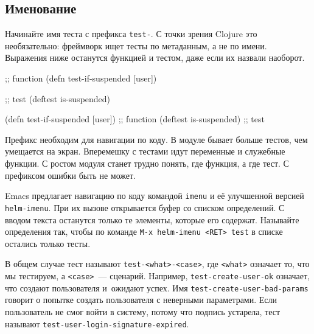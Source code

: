 \subsection{Именование}

Начинайте имя теста с префикса \verb|test-|. С точки зрения Clojure это
необязательно: фреймворк ищет тесты по метаданным, а не по имени. Выражения ниже
останутся функцией и тестом, даже если их назвали наоборот.

\ifnarrow

\begin{english}
  \begin{clojure}
;; function
(defn test-if-suspended [user])

;; test
(deftest is-suspended)
  \end{clojure}
\end{english}

\else

\begin{english}
  \begin{clojure}
(defn test-if-suspended [user]) ;; function
(deftest is-suspended)          ;; test
  \end{clojure}
\end{english}

\fi

Префикс необходим для навигации по коду. В модуле бывает больше тестов, чем
умещается на экран. Вперемешку с тестами идут переменные и служебные функции. С
ростом модуля станет трудно понять, где функция, а где тест. С префиксом ошибки
быть не может.


\mnoindent
Emacs предлагает навигацию по коду командой \verb|imenu| и её улучшенной
версией \verb|helm-imenu|. При их вызове открывается буфер со списком
определений. С вводом текста останутся только те элементы, которые его
содержат. Называйте определения так, чтобы по команде \verb|M-x helm-imenu <RET> test|
в списке остались только тесты.

В общем случае тест называют \verb|test-<what>-<case>|, где \verb|<what>|
означает то, что мы тестируем, а \verb|<case>|~--- сценарий. Например,
\verb|test-create-user-ok| означает, что создают пользователя и~ожидают
успех. Имя \verb|test-create-user-bad-params| говорит о попытке создать
пользователя с неверными параметрами. Если пользователь не смог войти в систему,
потому что подпись устарела, тест называют
\verb|test-user-login-signature-expired|.

